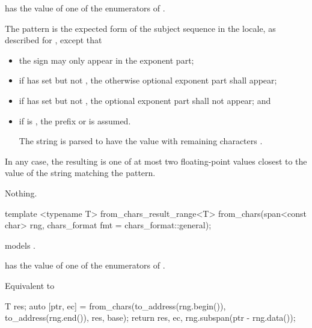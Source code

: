 \documentclass{wg21}
\begin{document}
\begin{itemdescr}
\pnum
\expects
{} has the value of
one of the enumerators of .

\pnum
\effects
The pattern is the expected form of the subject sequence
in the  locale,
as described for ,
except that
\begin{itemize}
    \item
    the sign  may only appear in the exponent part;
    \item
    if  has  set
    but not ,
    the otherwise optional exponent part shall appear;
    \item
    if  has  set
    but not ,
    the optional exponent part shall not appear; and
    \item
    if  is ,
    the prefix  or  is assumed.
    \begin{example}
        The string 
        is parsed to have the value
        with remaining characters .
    \end{example}
\end{itemize}
In any case, the resulting  is one of
at most two floating-point values
closest to the value of the string matching the pattern.

\pnum
\throws
Nothing.
\end{itemdescr}

\begin{addedblock}
\begin{itemdecl}
template <typename T>
from_chars_result_range<T> from_chars(span<const char> rng, chars_format fmt = chars_format::general);
\end{itemdecl}

\begin{itemdescr}
\pnum

\constraints {} models .

\expects
{} has the value of
one of the enumerators of .


\effects Equivalent to
\begin{codeblock}
    T res;
    auto [ptr, ec] = from_chars(to_address(rng.begin()), to_address(rng.end()), res, base);
    return {res, ec, rng.subspan(ptr - rng.data())};
\end{codeblock}

\end{itemdescr}

\end{addedblock}
\end{document}
